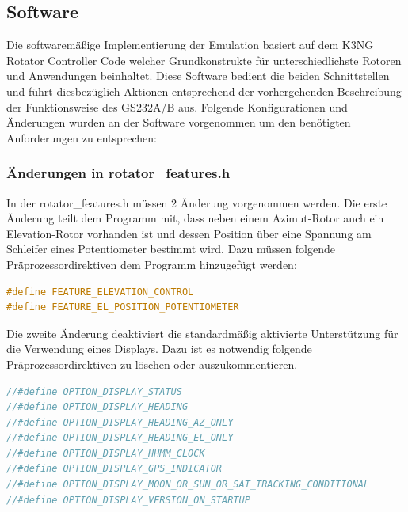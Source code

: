 \subsection{Software}
Die softwaremäßige Implementierung der Emulation basiert auf dem K3NG Rotator Controller Code \cite{good_k3ngk3ng_rotator_controller_2024} welcher Grundkonstrukte für unterschiedlichste Rotoren und Anwendungen beinhaltet. Diese Software bedient die beiden Schnittstellen und führt diesbezüglich Aktionen entsprechend der vorhergehenden Beschreibung der Funktionsweise des GS232A/B aus. Folgende Konfigurationen und Änderungen wurden an der Software vorgenommen um den benötigten Anforderungen zu entsprechen:

\subsubsection{Änderungen in rotator\_features.h}
In der rotator\_features.h müssen 2 Änderung vorgenommen werden. Die erste Änderung teilt dem Programm mit, dass neben einem Azimut-Rotor auch ein Elevation-Rotor vorhanden ist und dessen Position über eine Spannung am Schleifer eines Potentiometer bestimmt wird. Dazu müssen folgende Präprozessordirektiven dem Programm hinzugefügt werden:

\begin{lstlisting}[language=C++]
#define FEATURE_ELEVATION_CONTROL
#define FEATURE_EL_POSITION_POTENTIOMETER
\end{lstlisting}

Die zweite Änderung deaktiviert die standardmäßig aktivierte Unterstützung für die Verwendung eines Displays. Dazu ist es notwendig folgende Präprozessordirektiven zu löschen oder auszukommentieren.
\begin{lstlisting}[language=C++]
//#define OPTION_DISPLAY_STATUS
//#define OPTION_DISPLAY_HEADING
//#define OPTION_DISPLAY_HEADING_AZ_ONLY
//#define OPTION_DISPLAY_HEADING_EL_ONLY
//#define OPTION_DISPLAY_HHMM_CLOCK
//#define OPTION_DISPLAY_GPS_INDICATOR 
//#define OPTION_DISPLAY_MOON_OR_SUN_OR_SAT_TRACKING_CONDITIONAL
//#define OPTION_DISPLAY_VERSION_ON_STARTUP
\end{lstlisting}

